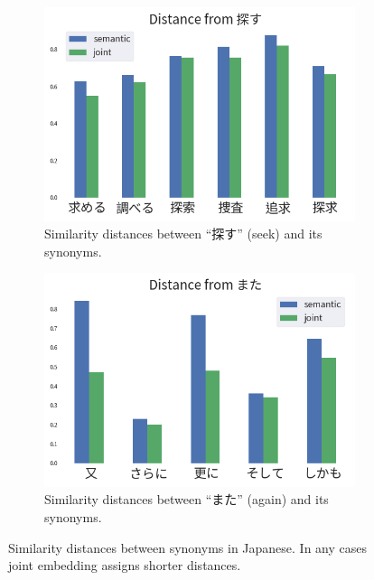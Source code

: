 \begin{CJK}{UTF8}{ipxm}
\begin{figure}[h]
        \begin{subfigure}[b]{0.45\textwidth}
            \centering
            \includegraphics[width=\textwidth]{../images/similarity_ja3.png}
            \caption{Similarity distances between ``探す'' (seek) and its synonyms.}
            \label{fig:similarity_ja3}
        \end{subfigure}
        \hspace{2em}
        \begin{subfigure}[b]{0.45\textwidth}
            \centering
            \includegraphics[width=\textwidth]{../images/similarity_ja4.png}
            \caption{Similarity distances between ``\mbox{また}'' (again) and its synonyms.}
            \label{fig:similarity_ja4}
        \end{subfigure}
        \caption[Similarity distances between synonyms in Japanese]{Similarity distances between synonyms in Japanese. In any cases joint embedding assigns shorter distances.}
        \label{fig:similarity_ja}
    \end{figure}
    \end{CJK}

